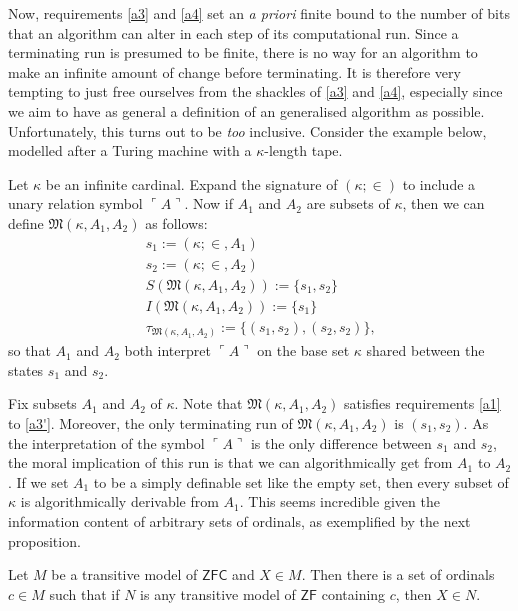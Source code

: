 \documentclass[12pt]{article}
\numberwithin{equation}{section}
\begin{document}
Now, requirements \ref{a3} and \ref{a4} set an \textit{a priori} finite bound to the number of bits that an algorithm can alter in each step of its computational run. Since a terminating run is presumed to be finite, there is no way for an algorithm to make an infinite amount of change before terminating. It is therefore very tempting to just free ourselves from the shackles of \ref{a3} and \ref{a4}, especially since we aim to have as general a definition of an generalised algorithm as possible. Unfortunately, this turns out to be \textit{too} inclusive. Consider the example below, modelled after a Turing machine with a $\kappa$-length tape.

\begin{ex}\label{ex21}
Let $\kappa$ be an infinite cardinal. Expand the signature of $(\kappa; \in)$ to include a unary relation symbol $\ulcorner A \urcorner$. Now if $A_1$ and $A_2$ are subsets of $\kappa$, then we can define $\mathfrak{M}(\kappa, A_1, A_2)$ as follows:
\begin{gather*}
    s_1 := (\kappa; \in, A_1) \\
    s_2 := (\kappa; \in, A_2) \\
    S(\mathfrak{M}(\kappa, A_1, A_2)) := \{s_1, s_2\} \\
    I(\mathfrak{M}(\kappa, A_1, A_2)) := \{s_1\} \\
    \tau_{\mathfrak{M}(\kappa, A_1, A_2)} := \{(s_1, s_2), (s_2, s_2)\} \text{,}
\end{gather*}
so that $A_1$ and $A_2$ both interpret $\ulcorner A \urcorner$ on the base set $\kappa$ shared between the states $s_1$ and $s_2$. 
\end{ex}

Fix subsets $A_1$ and $A_2$ of $\kappa$. Note that $\mathfrak{M}(\kappa, A_1, A_2)$ satisfies requirements \ref{a1} to \ref{a3'}. Moreover, the only terminating run of $\mathfrak{M}(\kappa, A_1, A_2)$ is $(s_1, s_2)$. As the interpretation of the symbol $\ulcorner A \urcorner$ is the only difference between $s_1$ and $s_2$, the moral implication of this run is that we can algorithmically get from $A_1$ to $A_2$. If we set $A_1$ to be a simply definable set like the empty set, then every subset of $\kappa$ is algorithmically derivable from $A_1$. This seems incredible given the information content of arbitrary sets of ordinals, as exemplified by the next proposition.

\begin{prop}\label{prop22}
Let $M$ be a transitive model of $\mathsf{ZFC}$ and $X \in M$. Then there is a set of ordinals $c \in M$ such that if $N$ is any transitive model of $\mathsf{ZF}$ containing $c$, then $X \in N$. 
\end{prop}
\end{document}
